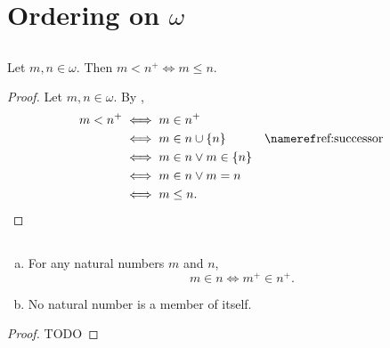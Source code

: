 \documentclass{report}
\begin{document}
\section{Ordering on \texorpdfstring{$\omega$}{Natural Numbers}}%

\subsection{}%

\begin{lemma}[8]

  Let $m, n \in \omega$.
  Then $m < n^+ \iff m \leq n$.

\end{lemma}

\begin{proof}

  Let $m, n \in \omega$.
  By ,
    \begin{align*}
      m < n^+
        & \iff m \in n^+ \\
        & \iff m \in n \cup \{n\} & \textref{ref:successor} \\
        & \iff m \in n \lor m \in \{n\} \\
        & \iff m \in n \lor m = n \\
        & \iff m \leq n.
    \end{align*}

\end{proof}

\subsection{}%

\begin{lemma}[4L]

  \begin{enumerate}[(a)]
    \item For any natural numbers $m$ and $n$, $$m \in n \iff m^+ \in n^+.$$
    \item No natural number is a member of itself.
  \end{enumerate}

\end{lemma}

\begin{proof}

  TODO

\end{proof}
\end{document}
